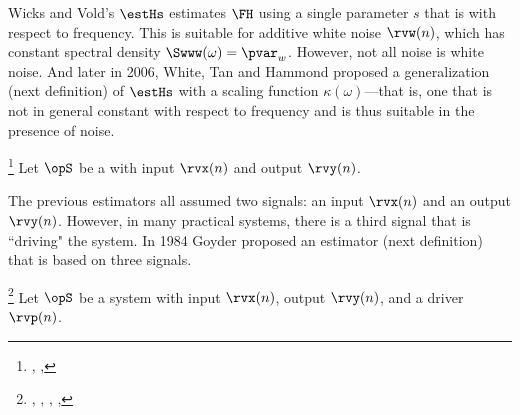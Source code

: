Wicks and Vold's $\estHs$ estimates $\FH$ using a single parameter $s$
that is  with respect to frequency.
This is suitable for additive white noise $\rvw(n)$, which has constant spectral density
$\Swww(\omega)=\pvar_w$.
However, not all noise is white noise.
And later in 2006, White, Tan and Hammond proposed a generalization (next definition) of $\estHs$ with a scaling
function $\kappa(\omega)$---that is, one that is not in general constant with respect to frequency
and is thus suitable in the presence of  noise.
\begin{definition}
\footnote{
  ,
  ,
  }
\label{def:Hkappa}
Let $\opS$ be a  with input $\rvx(n)$ and output $\rvy(n)$.
\end{definition}

The previous estimators all assumed two signals: an input $\rvx(n)$ and an output $\rvy(n)$.
However, in many practical systems, there is a third signal that is ``driving" the system.
In 1984 Goyder proposed an estimator (next definition) that is based on three signals.
\begin{definition}
\footnote{
  ,
  ,
  ,
  ,
  }
\label{def:Hc}
Let $\opS$ be a system with input $\rvx(n)$, output $\rvy(n)$, and a driver $\rvp(n)$.
\end{definition}

